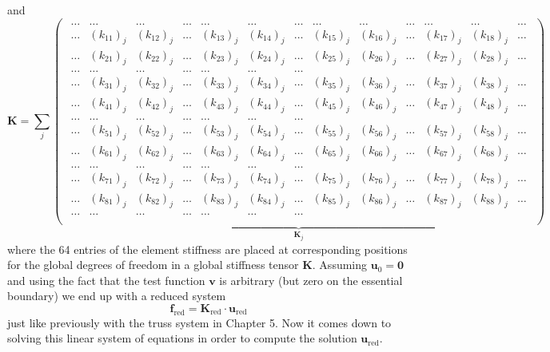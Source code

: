 and
\begin{equation}
    \mathbf{K} =
    \sum_j
    \underbrace{
    \begin{pmatrix}
    \begin{smallmatrix}
    \dots & \dots & \dots & \dots & \dots & \dots & \dots & \dots & \dots & \dots & \dots & \dots & \dots \\
    \dots & (k_{11})_j & (k_{12})_j & \dots & (k_{13})_j & (k_{14})_j & \dots & (k_{15})_j & (k_{16})_j & \dots & (k_{17})_j & (k_{18})_j & \dots  \\
     \dots & (k_{21})_j & (k_{22})_j & \dots & (k_{23})_j & (k_{24})_j & \dots & (k_{25})_j & (k_{26})_j & \dots & (k_{27})_j & (k_{28})_j & \dots  \\
    \dots & \dots & \dots & \dots & \dots & \dots & \dots  \\
    \dots & (k_{31})_j & (k_{32})_j & \dots & (k_{33})_j & (k_{34})_j & \dots & (k_{35})_j & (k_{36})_j & \dots & (k_{37})_j & (k_{38})_j & \dots  \\
    \dots & (k_{41})_j & (k_{42})_j & \dots & (k_{43})_j & (k_{44})_j & \dots & (k_{45})_j & (k_{46})_j & \dots & (k_{47})_j & (k_{48})_j & \dots  \\
    \dots & \dots & \dots & \dots & \dots & \dots & \dots  \\
    \dots & (k_{51})_j & (k_{52})_j & \dots & (k_{53})_j & (k_{54})_j & \dots & (k_{55})_j & (k_{56})_j & \dots & (k_{57})_j & (k_{58})_j & \dots  \\
     \dots & (k_{61})_j & (k_{62})_j & \dots & (k_{63})_j & (k_{64})_j & \dots & (k_{65})_j & (k_{66})_j & \dots & (k_{67})_j & (k_{68})_j & \dots  \\
    \dots & \dots & \dots & \dots & \dots & \dots & \dots  \\
    \dots & (k_{71})_j & (k_{72})_j & \dots & (k_{73})_j & (k_{74})_j & \dots & (k_{75})_j & (k_{76})_j & \dots & (k_{77})_j & (k_{78})_j & \dots  \\
    \dots & (k_{81})_j & (k_{82})_j & \dots & (k_{83})_j & (k_{84})_j & \dots & (k_{85})_j & (k_{86})_j & \dots & (k_{87})_j & (k_{88})_j & \dots  \\
    \dots & \dots & \dots & \dots & \dots & \dots & \dots  \\
    \end{smallmatrix}
    \end{pmatrix}
    }_{\mathbf{K}_j}
\end{equation}
where the 64 entries of the element stiffness are placed at corresponding positions for the global degrees of freedom in a global stiffness tensor $\mathbf{K}$. Assuming $\mathbf{u}_0=\mathbf{0}$ and using the fact that the test function $\mathbf{v}$ is arbitrary (but zero on the essential boundary) we end up with a reduced system 
\begin{equation}
     \mathbf{f}_\textrm{red} = \mathbf{K}_\textrm{red} \cdot \mathbf{u}_\textrm{red} 
     \label{eq:reduced_system_fem}
\end{equation}
just like previously with the truss system in Chapter 5. Now it comes down to solving this linear system of equations in order to compute the solution $\mathbf{u}_\textrm{red}$.

